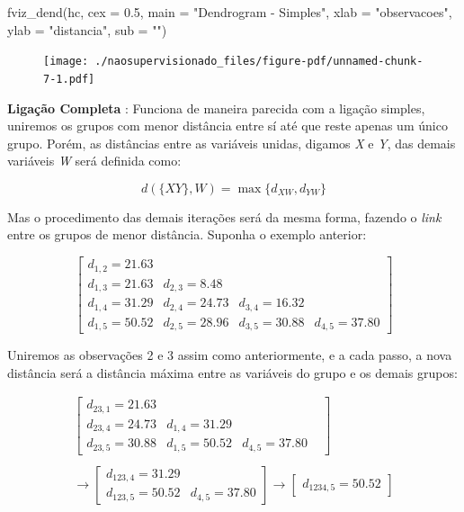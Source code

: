 \documentclass[
  letterpaper,
  DIV=11,
  numbers=noendperiod]{scrreprt}
\newenvironment{Shaded}{\begin{snugshade}}{\end{snugshade}}
\newcommand{\AttributeTok}[1]{\textcolor[rgb]{0.40,0.45,0.13}{#1}}
\newcommand{\FloatTok}[1]{\textcolor[rgb]{0.68,0.00,0.00}{#1}}
\newcommand{\FunctionTok}[1]{\textcolor[rgb]{0.28,0.35,0.67}{#1}}
\newcommand{\NormalTok}[1]{\textcolor[rgb]{0.00,0.23,0.31}{#1}}
\newcommand{\StringTok}[1]{\textcolor[rgb]{0.13,0.47,0.30}{#1}}
\begin{document}
\begin{Shaded}
\begin{Highlighting}[]
\FunctionTok{fviz\_dend}\NormalTok{(hc, }\AttributeTok{cex =} \FloatTok{0.5}\NormalTok{,}
          \AttributeTok{main =} \StringTok{"Dendrogram {-} Simples"}\NormalTok{,}
          \AttributeTok{xlab =} \StringTok{"observacoes"}\NormalTok{, }\AttributeTok{ylab =} \StringTok{"distancia"}\NormalTok{, }\AttributeTok{sub =} \StringTok{""}\NormalTok{)}
\end{Highlighting}
\end{Shaded}

\begin{figure}[H]

{\centering \texttt{[image: ./naosupervisionado\_files/figure-pdf/unnamed-chunk-7-1.pdf]}

}

\end{figure}

\textbf{Ligação Completa} : Funciona de maneira parecida com a ligação
simples, uniremos os grupos com menor distância entre sí até que reste
apenas um único grupo. Porém, as distâncias entre as variáveis unidas,
digamos \emph{X} e \emph{Y}, das demais variáveis \emph{W} será definida
como:

\[
d(\{XY\},W) = \max\{d_{XW},d_{YW}\}
\]

Mas o procedimento das demais iterações será da mesma forma, fazendo o
\emph{link} entre os grupos de menor distância. Suponha o exemplo
anterior:

\[
\begin{bmatrix}
d_{1,2}=21.63 &  & & \\
d_{1,3}= 21.63 & d_{2,3}=8.48 & & \\
d_{1,4}=31.29 & d_{2,4}=24.73 & d_{3,4}=16.32 \\
d_{1,5}=50.52 & d_{2,5}=28.96 & d_{3,5}=30.88 & d_{4,5}=37.80
\end{bmatrix}
\]

Uniremos as observações 2 e 3 assim como anteriormente, e a cada passo,
a nova distância será a distância máxima entre as variáveis do grupo e
os demais grupos:

\[
\begin{split}
\begin{bmatrix}
d_{23,1}=21.63 &  & & \\
d_{23,4}= 24.73 & d_{1,4}=31.29 & & \\
d_{23,5}=30.88 & d_{1,5}=50.52 & d_{4,5}=37.80 
\end{bmatrix}\\
\\
\rightarrow
\begin{bmatrix}
d_{123,4}=31.29 \\
d_{123,5}= 50.52 & d_{4,5} = 37.80
\end{bmatrix} \rightarrow
\begin{bmatrix}
d_{1234,5}=50.52
\end{bmatrix}
\end{split}
\]
\end{document}
